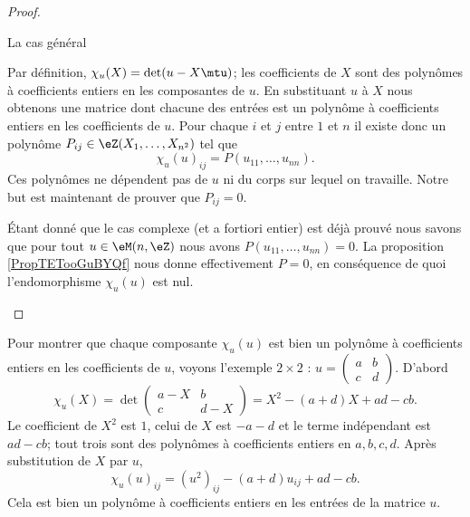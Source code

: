 \begin{proof}
\begin{subproof}
        \item[La cas général]

            Par définition, \( \chi_u(X)=\det(u-X\mtu)\); les coefficients de \( X\) sont des polynômes à coefficients entiers en les composantes de \( u\). En substituant \( u\) à \( X\) nous obtenons une matrice dont chacune des entrées est un polynôme à coefficients entiers en les coefficients de \( u\). Pour chaque \( i\) et \( j\) entre \( 1\) et \( n\) il existe donc un polynôme \( P_{ij}\in \eZ(X_1,\ldots, X_{n^2})\) tel que
            \begin{equation}
                \chi_u(u)_{ij}=P(u_{11},\ldots, u_{nn}).
            \end{equation}
            Ces polynômes ne dépendent pas de \( u\) ni du corps sur lequel on travaille. Notre but est maintenant de prouver que \( P_{ij}=0\).

            Étant donné que le cas complexe (et a fortiori entier) est déjà prouvé nous savons que pour tout \( u\in \eM(n,\eZ)\) nous avons \( P(u_{11},\ldots, u_{nn})=0\). La proposition \ref{PropTETooGuBYQf} nous donne effectivement \( P=0\), en conséquence de quoi l'endomorphisme \( \chi_u(u)\) est nul.

    \end{subproof}
\end{proof}

\begin{example}
    Pour montrer que chaque composante \( \chi_u(u)\) est bien un polynôme à coefficients entiers en les coefficients de \( u\), voyons l'exemple \( 2\times 2\) : \( u=\begin{pmatrix}
        a    &   b    \\ 
        c    &   d    
    \end{pmatrix}\). D'abord
    \begin{equation}
        \chi_u(X)=\det\begin{pmatrix}
            a-X    &   b    \\ 
            c    &   d-X    
        \end{pmatrix}=X^2-(a+d)X+ad-cb.
    \end{equation}
    Le coefficient de \( X^2\) est \( 1\), celui de \( X\) est \( -a-d\) et le terme indépendant est \( ad-cb\); tout trois sont des polynômes à coefficients entiers en \( a,b,c,d\). Après substitution de \( X\) par \( u\), 
    \begin{equation}
        \chi_u(u)_{ij}=(u^2)_{ij}-(a+d)u_{ij}+ad-cb.
    \end{equation}
    Cela est bien un polynôme à coefficients entiers en les entrées de la matrice \( u\).
\end{example}

